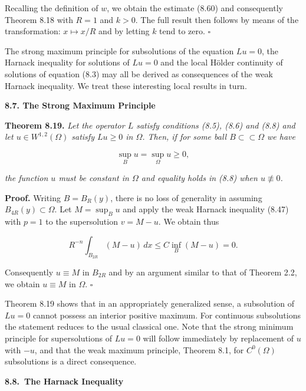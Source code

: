 Recalling the definition of $w$, we obtain the estimate (8.60) and consequently
Theorem 8.18 with $R = 1$ and $k > 0$. The full result then follows by means of the
transformation: $x \mapsto x/R$ and by letting $k$ tend to zero. $\square$

The strong maximum principle for subsolutions of the equation $Lu = 0$, the
Harnack inequality for solutions of $Lu = 0$ and the local H\"older continuity of
solutions of equation (8.3) may all be derived as consequences of the weak Harnack
inequality. We treat these interesting local results in turn.

\bigskip

\noindent\textbf{8.7. The Strong Maximum Principle}

\medskip

\noindent\textbf{Theorem 8.19.} \textit{Let the operator $L$ satisfy conditions (8.5), (8.6) and (8.8) and let
$u \in W^{1,2}(\Omega)$ satisfy $Lu \ge 0$ in $\Omega$. Then, if for some ball $B \subset\subset \Omega$ we have}

\[
\tag{8.62}
\sup_B u = \sup_\Omega u \ge 0,
\]

\textit{the function $u$ must be constant in $\Omega$ and equality holds in (8.8) when $u \not\equiv 0$.}



\pagestyle{empty}


\textbf{Proof.} Writing $B=B_R(y)$, there is no loss of generality in assuming $B_{4R}(y)\subset\Omega$.
Let $M=\sup_B u$ and apply the weak Harnack inequality (8.47) with $p=1$ to the
supersolution $v=M-u$. We obtain thus

\[
R^{-n}\int_{B_{2R}} (M-u)\,dx \le C\inf_B (M-u)=0.
\]

Consequently $u\equiv M$ in $B_{2R}$ and by an argument similar to that of Theorem 2.2,
we obtain $u\equiv M$ in $\Omega$. $\square$

Theorem 8.19 shows that in an appropriately generalized sense, a subsolution
of $Lu=0$ cannot possess an interior positive maximum. For continuous subsolutions
the statement reduces to the usual classical one. Note that the strong minimum
principle for supersolutions of $Lu=0$ will follow immediately by replacement
of $u$ with $-u$, and that the weak maximum principle, Theorem 8.1, for $C^0(\Omega)$
subsolutions is a direct consequence.

\bigskip

\centerline{\textbf{8.8.\ The Harnack Inequality}}

